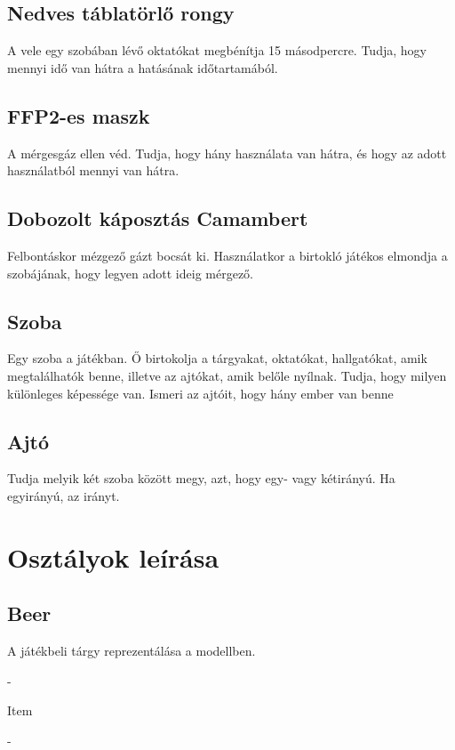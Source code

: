 \subsection{Nedves táblatörlő rongy}
A vele egy szobában lévő oktatókat megbénítja 15 másodpercre.
Tudja, hogy  mennyi idő van hátra a hatásának időtartamából.

\subsection{FFP2-es maszk}
A mérgesgáz ellen véd. Tudja, hogy hány használata van hátra, és hogy az adott használatból mennyi van hátra.

\subsection{Dobozolt káposztás Camambert}
Felbontáskor mézgező gázt bocsát ki. Használatkor a birtokló játékos elmondja a szobájának, hogy legyen adott ideig mérgező.

\subsection{Szoba}
Egy szoba a játékban. Ő birtokolja a tárgyakat, oktatókat, hallgatókat, amik megtalálhatók benne, illetve az ajtókat, amik belőle nyílnak. Tudja, hogy milyen különleges képessége van. Ismeri az ajtóit, hogy hány ember van benne

\subsection{Ajtó}
Tudja melyik két szoba között megy, azt, hogy egy- vagy kétirányú. Ha egyirányú, az irányt.

\section{Osztályok leírása}

\subsection{Beer}
\begin{class-template-responsibility}
    A játékbeli tárgy reprezentálása a modellben.
\end{class-template-responsibility}
\begin{class-template-interface}
    -
\end{class-template-interface}
\begin{class-template-baseclass}
    Item
\end{class-template-baseclass}
\begin{class-template-attribute}
    -
\end{class-template-attribute}
\begin{class-template-method}
\end{class-template-method}

